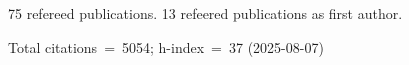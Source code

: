 75 refereed publications. 13 refeered publications as first author.

Total citations~=~5054; h-index~=~37 (2025-08-07)